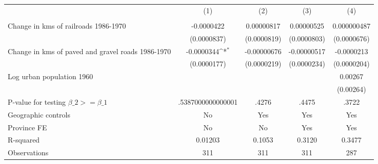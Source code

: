 {
\def\sym#1{\ifmmode^{#1}\else\(^{#1}\)\fi}
\begin{tabular}{l*{4}{c}}
\hline\hline
                &\multicolumn{1}{c}{(1)}&\multicolumn{1}{c}{(2)}&\multicolumn{1}{c}{(3)}&\multicolumn{1}{c}{(4)}\\
                &\multicolumn{1}{c}{}&\multicolumn{1}{c}{}&\multicolumn{1}{c}{}&\multicolumn{1}{c}{}\\
\hline
Change in kms of railroads 1986-1970&-0.0000422         &0.00000817         &0.00000525         &0.000000487         \\
                &(0.0000837)         &(0.0000819)         &(0.0000803)         &(0.0000676)         \\
[1em]
Change in kms of paved and gravel roads 1986-1970&-0.0000344\sym{*}  &-0.00000676         &-0.00000517         &-0.0000213         \\
                &(0.0000177)         &(0.0000219)         &(0.0000234)         &(0.0000204)         \\
[1em]
Log urban population 1960&                  &                  &                  &  0.00267         \\
                &                  &                  &                  &(0.00264)         \\
\hline
P-value for testing $\beta\_{2} >= \beta\_{1}$&.5387000000000001         &    .4276         &    .4475         &    .3722         \\
Geographic controls&       No         &      Yes         &      Yes         &      Yes         \\
Province FE     &       No         &       No         &      Yes         &      Yes         \\
R-squared       &  0.01203         &   0.1053         &   0.3120         &   0.3477         \\
Observations    &      311         &      311         &      311         &      287         \\
\hline\hline
\end{tabular}
}
